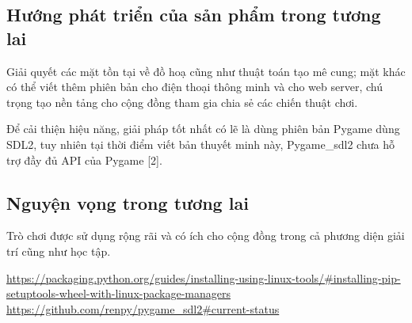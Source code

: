 \documentclass[a4paper,12pt]{article}
\begin{document}
\subsection{Hướng phát triển của sản phẩm trong tương lai}
Giải quyết các mặt tồn tại về đồ hoạ cũng như thuật toán tạo mê cung; mặt khác
có thể viết thêm phiên bản cho điện thoại thông minh và cho web server, chú
trọng tạo nền tảng cho cộng đồng tham gia chia sẻ các chiến thuật chơi.

Để cải thiện hiệu năng, giải pháp tốt nhất có lẽ là dùng phiên bản Pygame dùng
SDL2, tuy nhiên tại thời điểm viết bản thuyết minh này, Pygame\_sdl2 chưa hỗ trợ
đầy đủ API của Pygame [2].
\subsection{Nguyện vọng trong tương lai}
Trò chơi được sử dụng rộng rãi và có ích cho cộng đồng trong cả phương diện giải
trí cũng như học tập.

\renewcommand{\refname}{TÀI LIỆU THAM KHẢO}
\begin{thebibliography}{99}
   \url{https://packaging.python.org/guides/installing-using-linux-tools/\#installing-pip-setuptools-wheel-with-linux-package-managers}
   \url{https://github.com/renpy/pygame_sdl2#current-status}
\end{thebibliography}
\end{document}
